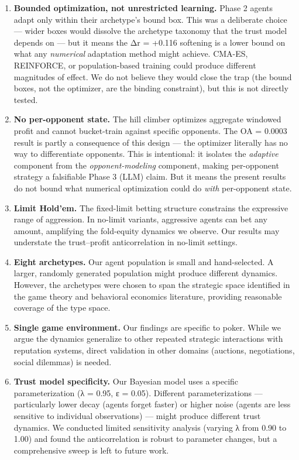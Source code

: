 \documentclass[
]{article}
\begin{document}
\begin{enumerate}
\def\labelenumi{\arabic{enumi}.}
\item
  \textbf{Bounded optimization, not unrestricted learning.} Phase 2
  agents adapt only within their archetype's bound box. This was a
  deliberate choice --- wider boxes would dissolve the archetype
  taxonomy that the trust model depends on --- but it means the Δr =
  +0.116 softening is a lower bound on what any \emph{numerical}
  adaptation method might achieve. CMA-ES, REINFORCE, or
  population-based training could produce different magnitudes of
  effect. We do not believe they would close the trap (the bound boxes,
  not the optimizer, are the binding constraint), but this is not
  directly tested.
\item
  \textbf{No per-opponent state.} The hill climber optimizes aggregate
  windowed profit and cannot bucket-train against specific opponents.
  The OA = 0.0003 result is partly a consequence of this design --- the
  optimizer literally has no way to differentiate opponents. This is
  intentional: it isolates the \emph{adaptive} component from the
  \emph{opponent-modeling} component, making per-opponent strategy a
  falsifiable Phase 3 (LLM) claim. But it means the present results do
  not bound what numerical optimization could do \emph{with}
  per-opponent state.
\item
  \textbf{Limit Hold'em.} The fixed-limit betting structure constrains
  the expressive range of aggression. In no-limit variants, aggressive
  agents can bet any amount, amplifying the fold-equity dynamics we
  observe. Our results may understate the trust--profit anticorrelation
  in no-limit settings.
\item
  \textbf{Eight archetypes.} Our agent population is small and
  hand-selected. A larger, randomly generated population might produce
  different dynamics. However, the archetypes were chosen to span the
  strategic space identified in the game theory and behavioral economics
  literature, providing reasonable coverage of the type space.
\item
  \textbf{Single game environment.} Our findings are specific to poker.
  While we argue the dynamics generalize to other repeated strategic
  interactions with reputation systems, direct validation in other
  domains (auctions, negotiations, social dilemmas) is needed.
\item
  \textbf{Trust model specificity.} Our Bayesian model uses a specific
  parameterization (λ = 0.95, ε = 0.05). Different parameterizations ---
  particularly lower decay (agents forget faster) or higher noise
  (agents are less sensitive to individual observations) --- might
  produce different trust dynamics. We conducted limited sensitivity
  analysis (varying λ from 0.90 to 1.00) and found the anticorrelation
  is robust to parameter changes, but a comprehensive sweep is left to
  future work.
\end{enumerate}
\end{document}
